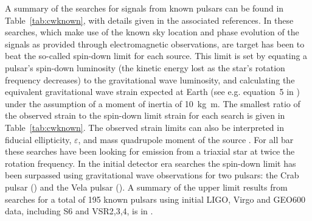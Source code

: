 A summary of the searches for signals from known pulsars can be found in Table~\ref{tab:cwknown}, with 
details given in the associated references. In these searches, which make use of the known sky location and 
phase evolution of the signals as provided through electromagnetic observations, are target has been to beat 
the so-called spin-down limit for each source. This limit is set by equating a pulsar's spin-down luminosity 
(the kinetic energy lost as the star's rotation frequency decreases) to the gravitational wave luminosity, 
and calculating the equivalent gravitational wave strain expected at Earth (see e.g. equation~5 in 
\cite{2014ApJ...785..119A}) under the assumption of a moment of inertia of 10~kg~m. The 
smallest ratio of the observed strain to the spin-down limit strain for each search is given in 
Table~\ref{tab:cwknown}. The observed strain limits can also be interpreted in fiducial ellipticity, 
$\varepsilon$, and mass quadrupole moment of the source \cite{2005PhRvL..95u1101O}. For all bar 
\cite{2015MNRAS.453.4399P} these searches have been looking for emission from a triaxial star at twice the 
rotation frequency. In the initial detector era searches the spin-down limit has been surpassed using 
gravitational wave observations for two pulsars: the Crab pulsar \cite{Abbott:2008j} 
() and the Vela pulsar \cite{Abadie:2011b} (). A 
summary of the upper limit results from searches for a total of 195 known pulsars using initial LIGO, Virgo 
and GEO600 data, including S6 and VSR2,3,4, is in \cite{2014ApJ...785..119A}.



